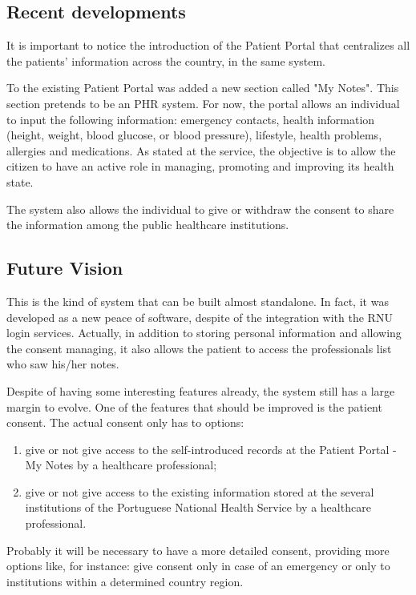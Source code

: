 \subsection{Recent developments}

It is important to notice the introduction of the Patient Portal that centralizes all the patients' information across the country, in the same system.

To the existing Patient Portal was added a new section called "My Notes". This section pretends to be an PHR system. For now, the portal allows an individual to input the following information: emergency contacts, health information (height, weight, blood glucose, or blood pressure), lifestyle, health problems, allergies and medications. As stated at the service, the objective is to allow the citizen to have an active role in managing, promoting and improving its health state.

The system also allows the individual to give or withdraw the consent to share the information among the public healthcare institutions.

\subsection{Future Vision}
This is the kind of system that can be built almost standalone. In fact, it was developed as a new peace of software, despite of the integration with the RNU login services. Actually, in addition to storing personal information and allowing the consent managing, it also allows the patient to access the professionals list who saw his/her notes.

Despite of having some interesting features already, the system still has a large margin to evolve. One of the features that should be improved is the patient consent. The actual consent only has to options:
\begin{enumerate}
\item give or not give access to the self-introduced records at the Patient Portal - My Notes by a healthcare professional;
\item give or not give access to the existing information stored at the several institutions of the Portuguese National Health Service by a healthcare professional.
\end{enumerate}

Probably it will be necessary to have a more detailed consent, providing more options like, for instance: give consent only in case of an emergency or only to institutions within a determined country region.

